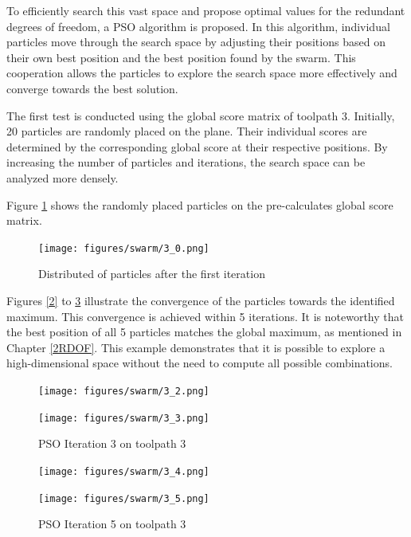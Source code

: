 To efficiently search this vast space and propose optimal values for the redundant degrees of freedom, a PSO algorithm is proposed. In this algorithm, individual particles move through the search space by adjusting their positions based on their own best position and the best position found by the swarm. This cooperation allows the particles to explore the search space more effectively and converge towards the best solution.

The first test is conducted using the global score matrix of toolpath 3. Initially, 20 particles are randomly placed on the plane. Their individual scores are determined by the corresponding global score at their respective positions. By increasing the number of particles and iterations, the search space can be analyzed more densely.

Figure \ref{PSO_1} shows the randomly placed particles on the pre-calculates global score matrix.

\begin{figure}[H]
	\centerline{\texttt{[image: figures/swarm/3\_0.png]}}
	\caption{Distributed of particles after the first iteration}
	\label{PSO_1}
\end{figure}


\newpage
Figures \ref{2} to \ref{5} illustrate the convergence of the particles towards the identified maximum. This convergence is achieved within 5 iterations. It is noteworthy that the best position of all 5 particles matches the global maximum, as mentioned in Chapter \ref{2RDOF}. This example demonstrates that it is possible to explore a high-dimensional space without the need to compute all possible combinations.


\begin{figure}[H]
	\centering
	\begin{minipage}{0.5\textwidth}
		\texttt{[image: figures/swarm/3\_2.png]}
		\caption{PSO Iteration 2 on toolpath 3}
		\label{2}
	\end{minipage}\hfill
	\begin{minipage}{0.5\textwidth}
		\texttt{[image: figures/swarm/3\_3.png]}
		\caption{PSO Iteration 3 on toolpath 3}
		\label{3}
	\end{minipage}\par
\end{figure}	


\begin{figure}[H]	
		\centering
	\begin{minipage}{0.5\textwidth}
		\texttt{[image: figures/swarm/3\_4.png]}
		\caption{PSO Iteration 4 on toolpath 3}
		\label{4}
	\end{minipage}\hfill
	\begin{minipage}{0.5\textwidth}
		\texttt{[image: figures/swarm/3\_5.png]}
		\caption{PSO Iteration 5 on toolpath 3}
		\label{5}
	\end{minipage}\par
\end{figure}

